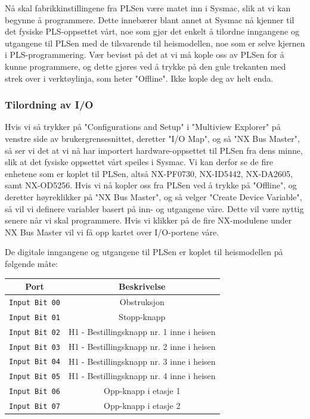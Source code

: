 \begin{alphasection}
Nå skal fabrikkinstillingene fra PLSen være matet inn i Sysmac, slik at vi kan begynne å programmere. Dette innebærer blant annet at Sysmac nå kjenner til det fysiske PLS-oppsettet vårt, noe som gjør det enkelt å tilordne inngangene og utgangene til PLSen med de tilsvarende til heismodellen, noe som er selve kjernen i PLS-programmering. Vær bevisst på det at vi må kople oss av PLSen for å kunne programmere, og dette gjøres ved å trykke på den gule trekanten med strek over i verktøylinja, som heter "Offline". Ikke kople deg av helt enda.

\subsubsection{Tilordning av I/O}
Hvis vi så trykker på "Configurations and Setup" i "Multiview Explorer" på venstre side av brukergrensesnittet, deretter "I/O Map", og så "NX Bus Master", så ser vi det at vi nå har importert hardware-oppsettet til PLSen fra dens minne, slik at det fysiske oppsettet vårt speiles i Sysmac. Vi kan derfor se de fire enhetene som er koplet til PLSen, altså NX-PF0730, NX-ID5442, NX-DA2605, samt NX-OD5256. Hvis vi nå kopler oss fra PLSen ved å trykke på "Offline", og deretter høyreklikker på "NX Bus Master", og så velger "Create Device Variable", så vil vi definere variabler basert på inn- og utgangene våre. Dette vil være nyttig senere når vi skal programmere. Hvis vi klikker på de fire NX-modulene under NX Bus Master vil vi få opp kartet over I/O-portene våre.

De digitale inngangene og utgangene til PLSen er koplet til heismodellen på følgende måte:

\begin{center}
 {\begin{tabular}{|c| c|} 
 \hline
 \textbf{Port} & \textbf{Beskrivelse} \\ 
 \toprule
 \verb|Input Bit 00| & Obstruksjon \\ 
 \hline
 \verb|Input Bit 01| & Stopp-knapp \\ 
 \hline
 \verb|Input Bit 02| & H1 - Bestillingsknapp nr. 1 inne i heisen \\ 
 \hline
 \verb|Input Bit 03| & H1 - Bestillingsknapp nr. 2 inne i heisen \\ 
 \hline
 \verb|Input Bit 04| & H1 - Bestillingsknapp nr. 3 inne i heisen \\ 
 \hline
 \verb|Input Bit 05| & H1 - Bestillingsknapp nr. 4 inne i heisen \\ 
 \hline
 \verb|Input Bit 06| & Opp-knapp i etasje 1 \\ 
 \hline
 \verb|Input Bit 07| & Opp-knapp i etasje 2 \\ 
 \toprule
 

\end{tabular}}
\end{center}
\end{alphasection}
